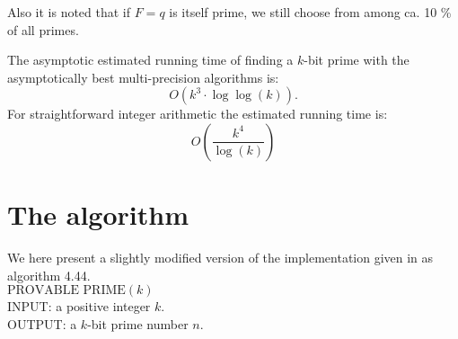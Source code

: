 \documentclass[11pt,a4paper]{article}
\begin{document}
Also it is noted that if $F=q$ is itself prime, we still
choose from among ca. 10 \% of all primes.

The asymptotic estimated running time of finding a $k$-bit prime with the
asymptotically best multi-precision algorithms is:
\[O(k^3\cdot\log\log(k)).\]
For straightforward integer arithmetic the estimated running time is:
\[O(\frac{k^{4}}{\log(k)})\]
\section{The algorithm}
We here present a slightly modified version of the implementation
given in \cite{Menezes:1997:HAC} as algorithm 4.44.\\

\noindent
$\text{PROVABLE PRIME}(k)$\\
INPUT: a positive integer $k$.\\
OUTPUT: a $k$-bit prime number $n$.
\end{document}
